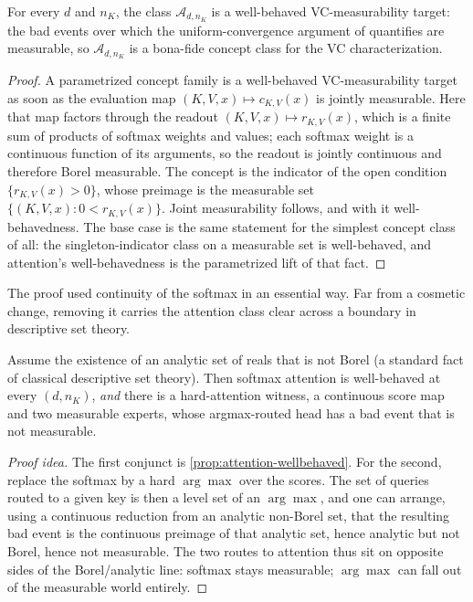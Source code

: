 \begin{prop}
\label{prop:attention-wellbehaved}
For every $d$ and $n_K$, the class $\mathcal{A}_{d,n_K}$ is a well-behaved VC-measurability target: the bad events over which the uniform-convergence argument of  quantifies are measurable, so $\mathcal{A}_{d,n_K}$ is a bona-fide concept class for the VC characterization.
\end{prop}

\begin{proof}
A parametrized concept family is a well-behaved VC-measurability target as soon as the evaluation map $(K,V,x) \mapsto c_{K,V}(x)$ is jointly measurable.  Here that map factors through the readout $(K,V,x) \mapsto r_{K,V}(x)$, which is a finite sum of products of softmax weights and values; each softmax weight is a continuous function of its arguments, so the readout is jointly continuous and therefore Borel measurable.  The concept is the indicator of the open condition $\{r_{K,V}(x) > 0\}$, whose preimage is the measurable set $\{(K,V,x) : 0 < r_{K,V}(x)\}$.  Joint measurability follows, and with it well-behavedness.  The base case is the same statement for the simplest concept class of all: the singleton-indicator class on a measurable set is well-behaved, and attention's well-behavedness is the parametrized lift of that fact.
\end{proof}

The proof used continuity of the softmax in an essential way.  Far from a cosmetic change, removing it carries the attention class clear across a boundary in descriptive set theory.

\begin{prop}
\label{prop:soft-hard-borel}
Assume the existence of an analytic set of reals that is not Borel (a standard fact of classical descriptive set theory).  Then softmax attention is well-behaved at every $(d,n_K)$, \emph{and} there is a hard-attention witness, a continuous score map and two measurable experts, whose argmax-routed head has a bad event that is not measurable.
\end{prop}

\begin{proof}[Proof idea]
The first conjunct is \cref{prop:attention-wellbehaved}.  For the second, replace the softmax by a hard $\arg\max$ over the scores.  The set of queries routed to a given key is then a level set of an $\arg\max$, and one can arrange, using a continuous reduction from an analytic non-Borel set, that the resulting bad event is the continuous preimage of that analytic set, hence analytic but not Borel, hence not measurable.  The two routes to attention thus sit on opposite sides of the Borel/analytic line: softmax stays measurable; $\arg\max$ can fall out of the measurable world entirely.
\end{proof}


